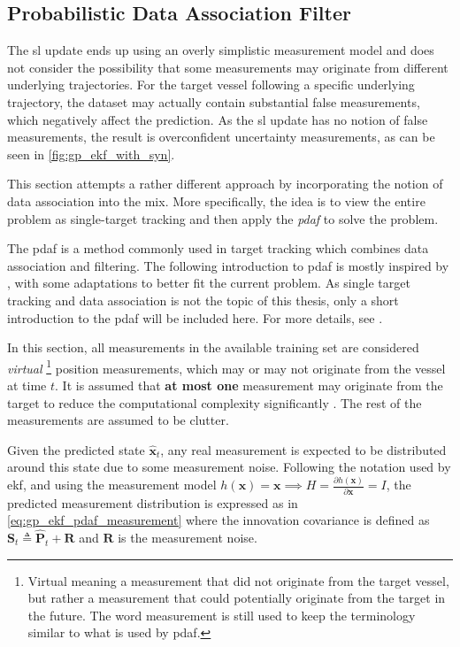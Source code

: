 \subsection{Probabilistic Data Association Filter}
The \acrshort{sl} update ends up using an overly simplistic measurement model and does not consider the possibility that some measurements may originate from different underlying trajectories. For the target vessel following a specific underlying trajectory, the dataset may actually contain substantial false measurements, which negatively affect the prediction. As the \acrshort{sl} update has no notion of false measurements, the result is overconfident uncertainty measurements, as can be seen in \cref{fig:gp_ekf_with_syn}.

This section attempts a rather different approach by incorporating the notion of data association into the mix. More specifically, the idea is to view the entire problem as single-target tracking and then apply the \textit{\acrfull{pdaf}} to solve the problem.

The \acrshort{pdaf} is a method commonly used in target tracking which combines data association and filtering. The following introduction to \acrshort{pdaf} is mostly inspired by \cite{sensorfusjon}, with some adaptations to better fit the current problem. As single target tracking and data association is not the topic of this thesis, only a short introduction to the \acrshort{pdaf} will be included here. For more details, see \cite{sensorfusjon,bar1995multitarget}.

In this section, all measurements in the available training set are considered \textit{virtual} \footnote{Virtual meaning a measurement that did not originate from the target vessel, but rather a measurement that could potentially originate from the target in the future. The word measurement is still used to keep the terminology similar to what is used by \acrshort{pdaf}.} position measurements, which may or may not originate from the vessel at time $t$. It is assumed that \textbf{at most one} measurement may originate from the target to reduce the computational complexity significantly \cite{sensorfusjon}. The rest of the measurements are assumed to be clutter.

Given the predicted state $\hat{\boldsymbol{x}}_t$, any real measurement is expected to be distributed around this state due to some measurement noise. Following the notation used by \acrshort{ekf}, and using the measurement model $h(\boldsymbol{x}) = \boldsymbol{x} \implies H = \frac{\partial h (\boldsymbol{x})}{\partial \boldsymbol{x}} = I$, the predicted measurement distribution is expressed as in \cref{eq:gp_ekf_pdaf_measurement} where the innovation covariance is defined as $\boldsymbol{S}_t \triangleq \hat{\boldsymbol{P}}_t + \boldsymbol{R}$ and $\boldsymbol{R}$ is the measurement noise.


